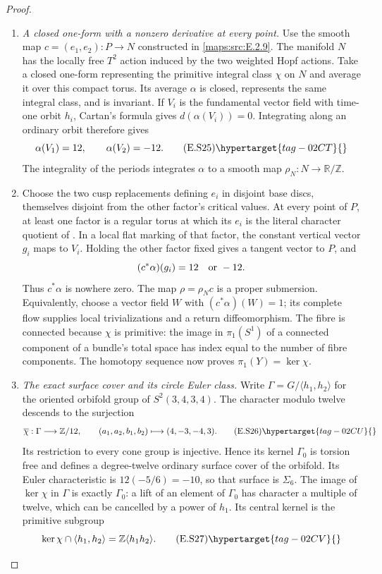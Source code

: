 \begin{proof}
\begin{enumerate}[label={$\langle1\rangle$\arabic*.},leftmargin=*]
\item \emph{A closed one-form with a nonzero derivative at every point.}
Use the smooth map $c=(e_1,e_2):P\to N$ constructed in \ref{maps:src:E.2.9}. The manifold $N$ has the locally free $T^2$ action
induced by the two weighted Hopf actions. Take a closed
one-form representing the primitive integral class $\chi$
on $N$ and average it over this compact torus. Its average
$\alpha$ is closed, represents the same integral class,
and is invariant. If $V_i$ is the fundamental vector field
with time-one orbit $h_i$, Cartan's formula gives
$d(\alpha(V_i))=0$. Integrating along an ordinary orbit
therefore gives
\[
                  \alpha(V_1)=12,\qquad \alpha(V_2)=-12.
 \tag{E.S25}\hypertarget{tag-02CT}{}\label{maps:eq:E.S25}
\]
The integrality of the periods integrates $\alpha$ to a
smooth map $\rho_N:N\to\mathbb R/\mathbb Z$.

\item Choose the two cusp replacements defining $e_i$ in disjoint
base discs, themselves disjoint from the other factor's
critical values. At every point of $P$, at least one factor
is a regular torus at which its $e_i$ is the literal character
quotient of . In a local flat marking of that factor,
the constant vertical vector $g_i$ maps to $V_i$. Holding
the other factor fixed gives a tangent vector to $P$, and
\[
                     (c^*\alpha)(g_i)=12\quad\hbox{or }-12.
\]
Thus $c^*\alpha$ is nowhere zero.  The map $\rho=\rho_Nc$ is a
proper submersion. Equivalently, choose a vector field $W$
with $(c^*\alpha)(W)=1$; its complete flow supplies local
trivializations and a return diffeomorphism. The fibre is
connected because $\chi$ is primitive: the image in
$\pi_1(S^1)$ of a connected component of a bundle's total
space has index equal to the number of fibre components.
The homotopy sequence now proves $\pi_1(Y)=\ker\chi$.

\item \emph{The exact surface cover and its circle Euler class.}
Write $\Gamma=G/\langle h_1,h_2\rangle$ for the oriented
orbifold group of $S^2(3,4,3,4)$. The character modulo
twelve descends to the surjection
\[
 \overline\chi:\Gamma\longrightarrow\mathbb Z/12,
       \qquad(a_1,a_2,b_1,b_2)\longmapsto(4,-3,-4,3).
 \tag{E.S26}\hypertarget{tag-02CU}{}\label{maps:eq:E.S26}
\]
Its restriction to every cone group is injective. Hence its
kernel $\Gamma_0$ is torsion free and defines a degree-twelve
ordinary surface cover of the orbifold. Its Euler characteristic
is $12(-5/6)=-10$, so that surface is $\Sigma_6$. The image
of $\ker\chi$ in $\Gamma$ is exactly $\Gamma_0$: a lift of
an element of $\Gamma_0$ has character a multiple of twelve,
which can be cancelled by a power of $h_1$. Its central
kernel is the primitive subgroup
\[
 \ker\chi\cap\langle h_1,h_2\rangle
                =\mathbb Z\langle h_1h_2\rangle.
 \tag{E.S27}\hypertarget{tag-02CV}{}\label{maps:eq:E.S27}
\]


\end{enumerate}
\end{proof}
